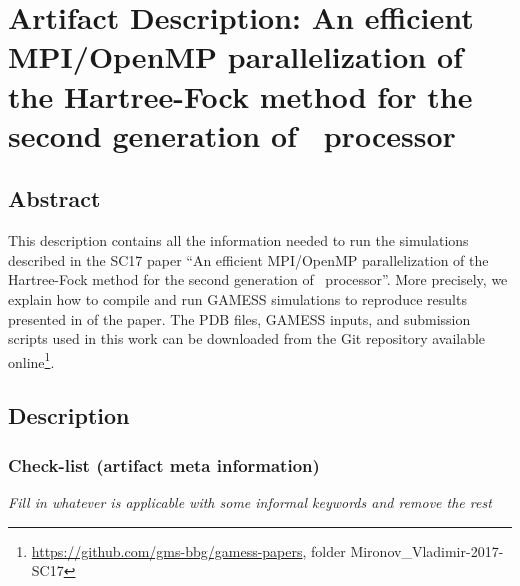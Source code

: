 \appendix
\section{Artifact Description: An efficient MPI/OpenMP parallelization of the Hartree-Fock method for the second generation of \intelphireg\ processor}

\subsection{Abstract}

This description contains all the information needed to run the simulations described in the SC17 paper ``An efficient MPI/OpenMP parallelization of the Hartree-Fock method for the second generation of \intelphireg\ processor''. More precisely, we explain how to compile and run GAMESS simulations to reproduce results presented in  of the paper. The PDB files, GAMESS inputs, and submission scripts used in this work can be downloaded from the Git repository available online\footnote{\label{gitrepo}\url{https://github.com/gms-bbg/gamess-papers}, folder Mironov\_Vladimir-2017-SC17}.

\subsection{Description}

\subsubsection{Check-list (artifact meta information)}

{\em Fill in whatever is applicable with some informal keywords and remove the rest}


